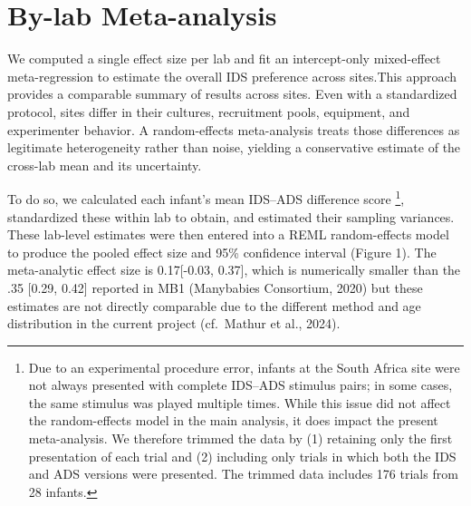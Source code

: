 \documentclass[
  ,man,floatsintext]{apa6}
\begin{document}
\hypertarget{by-lab-meta-analysis}{%
\section{By-lab Meta-analysis}\label{by-lab-meta-analysis}}

We computed a single effect size per lab and fit an intercept-only mixed-effect meta-regression to estimate the overall IDS preference across sites.This approach provides a comparable summary of results across sites. Even with a standardized protocol, sites differ in their cultures, recruitment pools, equipment, and experimenter behavior. A random-effects meta-analysis treats those differences as legitimate heterogeneity rather than noise, yielding a conservative estimate of the cross-lab mean and its uncertainty.

To do so, we calculated each infant's mean IDS--ADS difference score \footnote{ Due to an experimental procedure error, infants at the South Africa site were not always presented with complete IDS--ADS stimulus pairs; in some cases, the same stimulus was played multiple times. While this issue did not affect the random-effects model in the main analysis, it does impact the present meta-analysis. We therefore trimmed the data by (1) retaining only the first presentation of each trial and (2) including only trials in which both the IDS and ADS versions were presented. The trimmed data includes 176 trials from 28 infants.}, standardized these within lab to obtain, and estimated their sampling variances. These lab-level estimates were then entered into a REML random-effects model to produce the pooled effect size and 95\% confidence interval (Figure 1). The meta-analytic effect size is 0.17{[}-0.03, 0.37{]}, which is numerically smaller than the .35 {[}0.29, 0.42{]} reported in MB1 (Manybabies Consortium, 2020) but these estimates are not directly comparable due to the different method and age distribution in the current project (cf.~Mathur et al., 2024).
\end{document}
